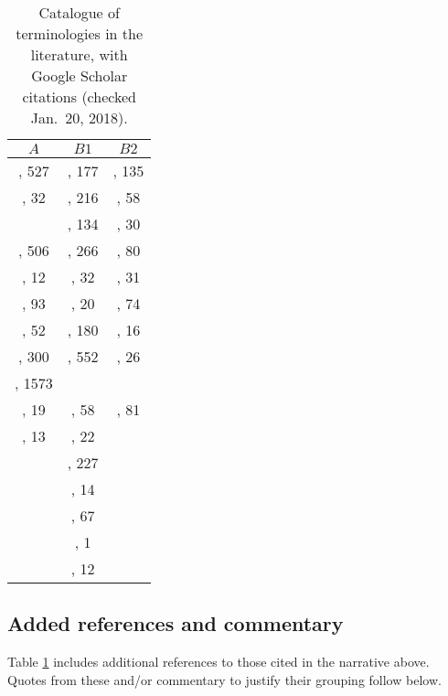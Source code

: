 \documentclass{statement}
\newlength{\up}
\begin{document}
\bigskip

\begin{table}[h]
\caption{Catalogue of terminologies in the literature, with Google Scholar citations (checked Jan.\ 20, 2018).}
\begin{footnotesize}
\begin{tabular}{c c c}
$A$				&	$B1$				&	$B2$ \\ \hline
\cite{king1995}, 527	& \cite{pengETal2006}, 177	& \cite{drummond2009}, 135 \\
\cite{jcgm2008}, 32	& \cite{gentlemanETal2007}, 216	& \cite{casadevall_fang2010}, 58\\
				& \cite{laineETal2007}, 134	& \cite{stodden2011}, 30\\
\cite{dewaldETal1986}, 506 & \cite{vandewalleETal2009}, 266& \cite{davison2012}, 80 \\
\cite{pesaran2003}, 12 & \cite{leveque2009}, 32	& \cite{loscalzo2012}, 31\\
\cite{mccullough2008}, 93 & \cite{hyndman2010}, 20	& \cite{levequeETal2012}, 74\\
\cite{garijoETal2013}, 52	& \cite{jasnyETal2011}, 180& \cite{crook2013}, 16\\
\cite{openscience2012}, 300	& \cite{peng2011}, 552 	& \cite{cooper2015}, 26\\
\cite{openscience2015}, 1573	& 					& \\
\cite{stodden2015}, 19 & \cite{koenkerETal2009}, 58	& \cite{cartwright1991}, 81\\
\cite{duvendackETal2017}, 13 &\cite{delescluseETal2012}, 22	&\\
				&  \cite{sandveETal2013}, 227	& \\
				& \cite{topalidou2015}, 14	& \\
				&\cite{iqbalETal2016}, 67	& \\
				&\cite{stevens2017}, 1	& \\
				& \cite{bollenETal2015}, 12	&\\
\end{tabular}
\end{footnotesize}
\label{repro-table}
\end{table}%

\subsection*{Added references and commentary}
\vspace{\up}

Table \ref{repro-table} includes additional references to those cited in the narrative above.  Quotes from these and/or commentary to justify their grouping follow below.
\end{document}
